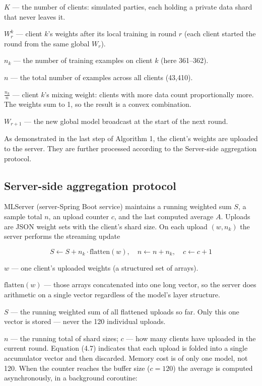 $K$ --- the number of clients: simulated parties, each holding a private data shard that never leaves it.

$W_{r}^{k}$ --- client $k$’s weights after its local training in round $r$ (each client started the round from the same global $W_{r}$).

$n_{k}$ --- the number of training examples on client $k$ (here 361--362).

$n$ --- the total number of examples across all clients (43,410).

$\frac{n_{k}}{n}$ --- client $k$’s mixing weight: clients with more data count proportionally more. The weights sum to 1, so the result is a convex combination.

$W_{r+1}$ --- the new global model broadcast at the start of the next round.

As demonstrated in the last step of Algorithm 1, the client’s weights are uploaded to the server. They are further processed according to the Server-side aggregation protocol.

\subsection{Server-side aggregation protocol}
MLServer (server-Spring Boot service) maintains a running weighted sum $S$, a sample total $n$, an upload counter $c$, and the last computed average $A$. Uploads are JSON weight sets with the client’s shard size. On each upload $(w, n_k)$ the server performs the streaming update

\begin{equation}
  S \leftarrow S + n_{k} \cdot \text{flatten}(w), \quad n \leftarrow n + n_{k}, \quad c \leftarrow c + 1
  \label{eq:ch4_4_7}
\end{equation}

$w$ --- one client’s uploaded weights (a structured set of arrays).

$\text{flatten}(w)$ --- those arrays concatenated into one long vector, so the server does arithmetic on a single vector regardless of the model’s layer structure.

$S$ --- the running weighted sum of all flattened uploads so far. Only this one vector is stored --- never the 120 individual uploads.

$n$ --- the running total of shard sizes; $c$ --- how many clients have uploaded in the current round.  Equation (4.7) indicates that each upload is folded into a single accumulator vector and then discarded. Memory cost is of only one model, not 120. When the counter reaches the buffer size ($c = 120$) the average is computed asynchronously, in a background coroutine:


